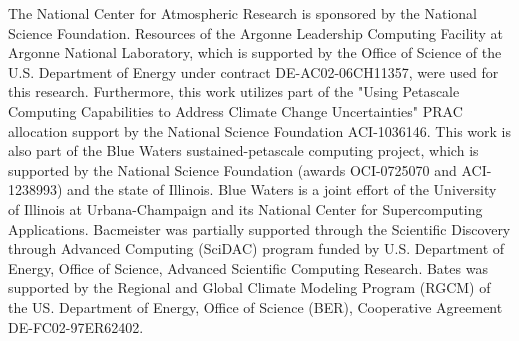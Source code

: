 \documentclass[draft,ms]{AGUTeX}
\begin{document}
\begin{article}
\begin{acknowledgments}
The National Center for Atmospheric Research is sponsored by the National Science Foundation. Resources of the Argonne Leadership Computing Facility at Argonne National Laboratory, which is supported by the Office of Science of the U.S. Department of Energy under contract DE-AC02-06CH11357, were used for this research. Furthermore, this work utilizes part of the "Using Petascale Computing Capabilities to Address Climate Change Uncertainties" PRAC allocation support by the National Science Foundation ACI-1036146. This work is also part of the Blue Waters sustained-petascale computing project, which is supported by the National Science Foundation (awards OCI-0725070 and ACI-1238993) and the state of Illinois. Blue Waters is a joint effort of the University of Illinois at Urbana-Champaign and its National Center for Supercomputing Applications. Bacmeister was partially supported through the Scientific Discovery through Advanced Computing (SciDAC) program funded by U.S. Department of Energy, Office of Science, Advanced Scientific Computing Research. Bates was supported by the Regional and Global Climate Modeling Program (RGCM) of the US. Department of Energy, Office of Science (BER), Cooperative Agreement DE-FC02-97ER62402.  %
\end{acknowledgments}








\end{article}
\end{document}
